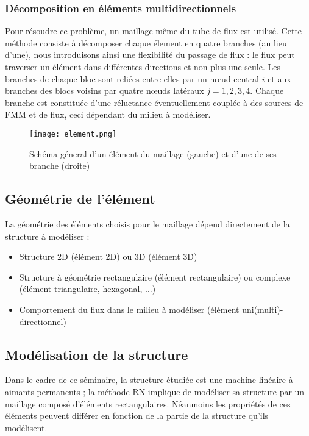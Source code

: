 \subsubsection{Décomposition en éléments multidirectionnels}
Pour résoudre ce problème, un maillage même du tube de flux est utilisé. Cette méthode consiste à
décomposer chaque élement en quatre branches (au lieu d'une), nous introduisons ainsi une flexibilité du
passage de flux : le flux peut traverser un élément dans différentes directions et non plus
une seule. Les branches de chaque bloc sont reliées entre elles par un nœud central $i$ et aux branches des blocs voisins par quatre nœuds latéraux $j=1,2,3,4$. Chaque branche est constituée d'une réluctance éventuellement couplée à des
sources de FMM et de flux, ceci dépendant du milieu à modéliser.

\begin{figure}[H]
    \centering
    \texttt{[image: element.png]}
    \caption{Schéma géneral d'un élément du maillage (gauche) et d'une de ses branche (droite)}
\end{figure}

\subsection{Géométrie de l'élément}
La géométrie des éléments choisis pour le maillage dépend directement de la structure à modéliser : 

\begin{itemize}
    \item Structure 2D (élément 2D) ou 3D (élément 3D)
    \item Structure à géométrie rectangulaire (élément rectangulaire) ou complexe (élément triangulaire, hexagonal, ...)
    \item Comportement du flux dans le milieu à modéliser (élément uni(multi)-directionnel)
\end{itemize}

\subsection{Modélisation de la structure}
Dans le cadre de ce séminaire, la structure étudiée est une machine linéaire à aimants permanents ; la méthode RN implique de modéliser sa structure par un maillage composé d'éléments rectangulaires. Néanmoins les propriétés de ces éléments peuvent différer en fonction de la partie de la structure qu'ils modélisent.

